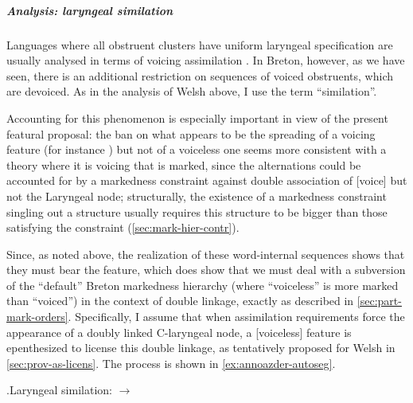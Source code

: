 \subparagraph{Analysis: laryngeal similation}
\label{sec:analys-laryng-simil}

Languages where all obstruent clusters have uniform laryngeal specification are usually analysed in terms of voicing assimilation \citep[\egm][]{lombardi95:_book,lombardi99:_posit_faith_and_voicin_assim,wetzels01:_typol_voicin_devoic}. In Breton, however, as we have seen, there is an additional restriction on sequences of voiced obstruents, which are devoiced. As in the analysis of Welsh above, I use the term \enquote{similation}.

Accounting for this phenomenon is especially important in view of the present featural proposal: the ban on what appears to be the spreading of a voicing feature (\cf for instance \citealp{uffmann05:_optim}) but not of a voiceless one seems more consistent with a theory where it is voicing that is marked, since the alternations could be accounted for by a markedness constraint against double association of [voice] but not the Laryngeal node; structurally, the existence of a markedness constraint singling out a structure usually requires this structure to be bigger than those satisfying the constraint (\cref{sec:mark-hier-contr}).

Since, as noted above, the realization of these word\hyp internal sequences shows that they must bear the  feature, which does show that we must deal with a subversion of the \enquote{default} Breton markedness hierarchy (where \enquote{voiceless} is more marked than \enquote{voiced}) in the context of double linkage, exactly as described in \cref{sec:part-mark-orders}. Specifically, I assume that when assimilation requirements force the appearance of a doubly linked C-laryngeal node, a [voiceless] feature is epenthesized to license this double linkage, as tentatively proposed for Welsh in \cref{sec:prov-as-licens}. The process is shown in \ref{ex:annoazder-autoseg}.

\ex.\label{ex:annoazder-autoseg}Laryngeal similation:  $\rightarrow$ \ipa{[ãnˈwɛstər]}\\

